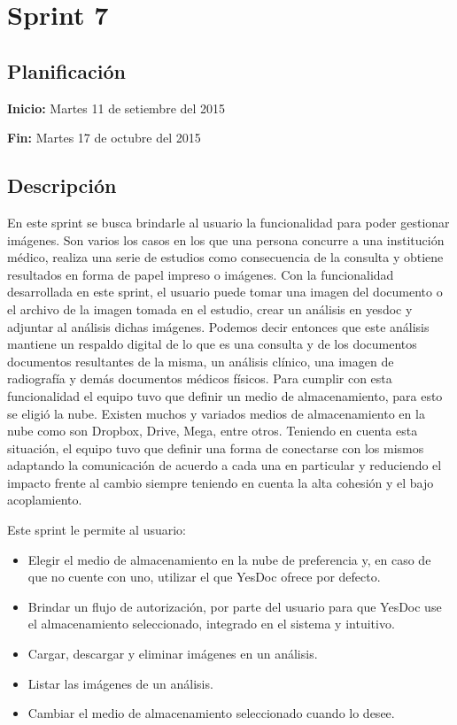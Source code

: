 \documentclass[a4paper,12pt]{article}
\begin{document}

\section{Sprint 7} %

\subsection{Planificación}

\textbf{Inicio: }Martes 11 de setiembre del 2015 

\textbf{Fin:} Martes 17 de octubre del 2015



\subsection{Descripción}

En este sprint se busca brindarle al usuario la funcionalidad para poder gestionar imágenes. Son varios los casos en los que una persona concurre a una institución médico, realiza una serie de estudios como consecuencia de la consulta y obtiene resultados en forma de papel impreso o imágenes. Con la funcionalidad desarrollada en este sprint, el usuario puede tomar una imagen del documento o el archivo de la imagen tomada en el estudio, crear un análisis en yesdoc y adjuntar al análisis dichas imágenes. Podemos decir entonces que este análisis mantiene un respaldo digital de lo que es una consulta y de los documentos documentos resultantes de la misma, un análisis clínico, una imagen de radiografía y demás documentos médicos físicos. Para cumplir con esta funcionalidad el equipo tuvo que definir un medio de almacenamiento, para esto se eligió la nube. Existen muchos y variados medios de almacenamiento en la nube como son Dropbox, Drive, Mega, entre otros. Teniendo en cuenta esta situación, el equipo tuvo que definir una forma de conectarse con los mismos adaptando la comunicación de acuerdo a cada una en particular y reduciendo el impacto frente al cambio siempre teniendo en cuenta la alta cohesión y el bajo acoplamiento.
	
	
	Este sprint le permite al usuario:
	\begin{itemize}
		\item Elegir el medio de almacenamiento en la nube de preferencia y, en caso de que no cuente con uno, utilizar el que YesDoc ofrece por defecto.
		\item Brindar un flujo de autorización, por parte del usuario para que YesDoc use el almacenamiento seleccionado, integrado en el sistema y intuitivo.
		\item Cargar, descargar y eliminar imágenes en un análisis.
		\item Listar las imágenes de un análisis.
		\item Cambiar el medio de almacenamiento seleccionado cuando lo desee. %
	\end{itemize}
	  
\end{document}
